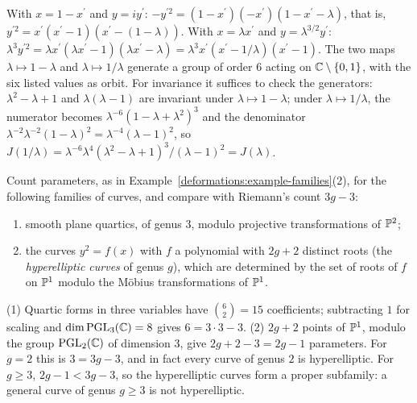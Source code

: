 \begin{solution}
With $x = 1 - x^{\prime}$ and $y = iy^{\prime}$: $-y^{\prime 2} = (1 - x^{\prime})(-x^{\prime})(1 - x^{\prime} - \lambda)$, that is, $y^{\prime 2} = x^{\prime}(x^{\prime} - 1)(x^{\prime} - (1 - \lambda))$. With $x = \lambda x^{\prime}$ and
$y = \lambda^{3/2}y^{\prime}$: $\lambda^3y^{\prime 2} = \lambda x^{\prime}(\lambda x^{\prime} - 1)(\lambda x^{\prime} - \lambda) = \lambda^3x^{\prime}(x^{\prime} - 1/\lambda)(x^{\prime} - 1)$. The two maps $\lambda \mapsto 1 - \lambda$ and
$\lambda \mapsto 1/\lambda$ generate a group of order $6$ acting on $\mathbb{C} \setminus \{0, 1\}$, with the six listed values as orbit. For invariance it suffices to check the generators: $\lambda^2 - \lambda + 1$ and
$\lambda(\lambda - 1)$ are invariant under $\lambda \mapsto 1 - \lambda$; under $\lambda \mapsto 1/\lambda$, the numerator becomes $\lambda^{-6}(1 - \lambda + \lambda^2)^3$ and the denominator
$\lambda^{-2}\lambda^{-2}(1 - \lambda)^2 = \lambda^{-4}(\lambda - 1)^2$, so $J(1/\lambda) = \lambda^{-6}\lambda^4(\lambda^2 - \lambda + 1)^3/(\lambda - 1)^2 = J(\lambda)$.
\end{solution}

\begin{exercise}\label{deformations:exercise-parameter-counts}
Count parameters, as in Example~\ref{deformations:example-families}(2), for the following families of curves, and compare with Riemann's count $3g - 3$:
\begin{enumerate}
\item smooth plane quartics, of genus $3$, modulo projective transformations of $\mathbb{P}^2$;
\item the curves $y^2 = f(x)$ with $f$ a polynomial with $2g + 2$ distinct roots (the \emph{hyperelliptic curves} of genus $g$), which are determined by the set of roots of $f$ on $\mathbb{P}^1$ modulo
the M\"obius transformations of $\mathbb{P}^1$.
\end{enumerate}
\end{exercise}

\begin{solution}
(1) Quartic forms in three variables have $\binom{6}{2} = 15$ coefficients; subtracting $1$ for scaling and $\dim\mathrm{PGL}_3(\mathbb{C}) = 8$ gives $6 = 3 \cdot 3 - 3$. (2) $2g + 2$ points of $\mathbb{P}^1$, modulo the group
$\mathrm{PGL}_2(\mathbb{C})$ of dimension $3$, give $2g + 2 - 3 = 2g - 1$ parameters. For $g = 2$ this is $3 = 3g - 3$, and in fact every curve of genus $2$ is hyperelliptic. For $g \geq 3$, $2g - 1 < 3g - 3$, so
the hyperelliptic curves form a proper subfamily: a general curve of genus $g \geq 3$ is not hyperelliptic.
\end{solution}
